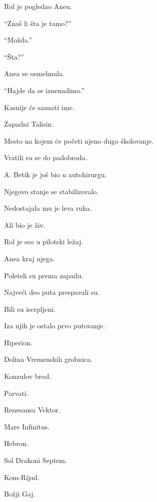 Rol je pogledao Aneu.

``Znaš li šta je tamo?''

\bigskip

``Možda.''

``Šta?''

\bigskip

Anea se osmehnula.

``Hajde da se iznenadimo.''

\bigskip

Kasnije će saznati ime.

\bigskip

Zapadni Talisin.

\bigskip

Mesto na kojem će početi njeno dugo školovanje.

\bigskip

Vratili su se do padobroda.

\bigskip

A. Betik je još bio u autohirurgu.

Njegovo stanje se stabilizovalo.

\bigskip

Nedostajala mu je leva ruka.

Ali bio je živ.

\bigskip

Rol je seo u pilotski ležaj.

Anea kraj njega.

\bigskip

Poleteli su prema zapadu.

\bigskip

Najveći deo puta prespavali su.

\bigskip

Bili su iscrpljeni.

\bigskip

Iza njih je ostalo prvo putovanje.

\bigskip

Hiperion.

Dolina Vremenskih grobnica.

Konzulov brod.

Parvati.

Renesansa Vektor.

Mare Infinitus.

Hebron.

Sol Drakoni Septem.

Kom-Rijad.

Božji Gaj.

\bigskip


